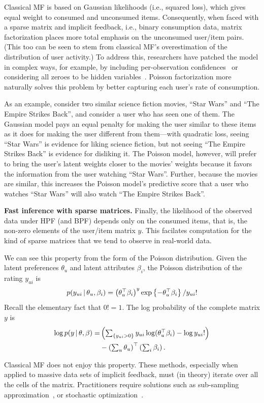 Classical MF is based on Gaussian likelihoods (i.e., squared loss),
which gives equal weight to consumed and unconsumed items.
Consequently, when faced with a sparse matrix and implicit feedback,
i.e., binary consumption data, matrix factorization places more total
emphasis on the unconsumed user/item pairs.  (This too can be seen to
stem from classical MF's overestimation of the distribution of user
activity.)  To address this, researchers have patched the model in
complex ways, for example, by including per-observation
confidences~\cite{Koren:2009} or considering all zeroes to be hidden
variables~\cite{Paquet:2013p9197}.  Poisson factorization more
naturally solves this problem by better capturing each user's rate of
consumption.

As an example, consider two similar science fiction movies, ``Star
Wars'' and ``The Empire Strikes Back'', and consider a user who has
seen one of them.  The Gaussian model pays an equal penalty for making
the user similar to these items as it does for making the user
different from them---with quadratic loss, seeing ``Star Wars'' is
evidence for liking science fiction, but not seeing ``The Empire
Strikes Back'' is evidence for disliking it.  The Poisson model,
however, will prefer to bring the user's latent weights closer to the
movies' weights because it favors the information from the user
watching ``Star Wars''. Further, because the movies are similar, this
increases the Poisson model's predictive score that a user who watches
``Star Wars'' will also watch ``The Empire Strikes Back''.

{\bf Fast inference with sparse matrices.}  Finally, the likelihood of
the observed data under HPF (and BPF) depends only on the consumed
items, that is, the non-zero elements of the user/item matrix $y$.
This facilates computation for the kind of sparse matrices that we
tend to observe in real-world data.

We can see this property from the form of the Poisson distribution.
Given the latent preferences $\theta_u$ and latent attributes
$\beta_i$, the Poisson distribution of the rating $y_{ui}$ is
\begin{equation}
  p(y_{ui} \,\vert\, \theta_u, \beta_i) =
  \left(\theta_u^\top \beta_i\right)^y
  \exp\left\{-\theta_u^\top \beta_i \right\} / y_{ui}!
\end{equation}
Recall the elementary fact that $0! = 1$.  The log probability of the
complete matrix $y$ is
\begin{align}
  \log p(y \,\vert\, \theta, \beta) =
  & \left(\textstyle \sum_{\{y_{ui} > 0\}}
    y_{ui} \log (\theta_u^\top \beta_i) - \log y_{ui}!
  \right) \\
  & -
  \left(\textstyle\sum_{u} \theta_u\right)^\top \left(\textstyle
    \sum_{i} \beta_i\right). \nonumber
\end{align}

Classical MF does not enjoy this property. These methods, especially
when applied to massive data sets of implicit feedback, must (in
theory) iterate over all the cells of the matrix.  Practitioners
require solutions such as sub-sampling~\cite{Dror:2012a}
approximation~\cite{Hu:2008p9402}, or stochastic
optimization~\cite{Mairal:2010}.
